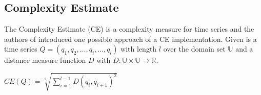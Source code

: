 \subsection{Complexity Estimate} \label{complexity_estimate}
The Complexity Estimate (CE) is a complexity measure for time series and the authors of \cite{batista2011complexity}
introduced one possible approach of a CE implementation. Given is a time series $Q = (q_1, q_2, \dots, q_i, \dots, q_l)$
with length $l$ over the domain set $\mathbb{U}$ and a distance measure function $D$ with
$D: \mathbb{U} \times \mathbb{U} \to \mathbb{R}$.
\begin{center}
    $CE(Q) = \sqrt[2]{\sum \limits_{i=1}^{l-1} D(q_i, q_{i + 1})^2}$
\end{center}
